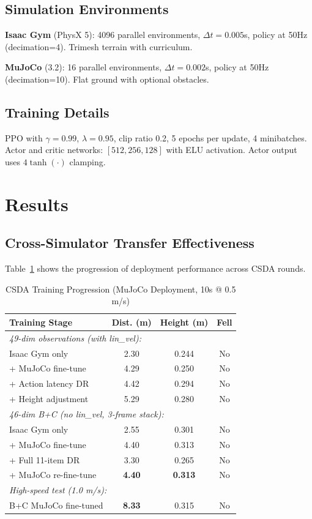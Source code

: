\documentclass[conference]{IEEEtran}
\begin{document}
\subsection{Simulation Environments}

\textbf{Isaac Gym} (PhysX 5): 4096 parallel environments, $\Delta t = 0.005$s, policy at 50Hz (decimation=4). Trimesh terrain with curriculum.

\textbf{MuJoCo} (3.2): 16 parallel environments, $\Delta t = 0.002$s, policy at 50Hz (decimation=10). Flat ground with optional obstacles.

\subsection{Training Details}

PPO with $\gamma = 0.99$, $\lambda = 0.95$, clip ratio 0.2, 5 epochs per update, 4 minibatches. Actor and critic networks: $[512, 256, 128]$ with ELU activation. Actor output uses $4 \tanh(\cdot)$ clamping.

\section{Results}

\subsection{Cross-Simulator Transfer Effectiveness}

Table~\ref{tab:main_results} shows the progression of deployment performance across CSDA rounds.

\begin{table}[t]
\caption{CSDA Training Progression (MuJoCo Deployment, 10s @ 0.5 m/s)}
\label{tab:main_results}
\centering
\begin{tabular}{lccc}
\toprule
\textbf{Training Stage} & \textbf{Dist. (m)} & \textbf{Height (m)} & \textbf{Fell} \\
\midrule
\multicolumn{4}{l}{\textit{49-dim observations (with lin\_vel):}} \\
Isaac Gym only & 2.30 & 0.244 & No \\
+ MuJoCo fine-tune & 4.29 & 0.250 & No \\
+ Action latency DR & 4.42 & 0.294 & No \\
+ Height adjustment & 5.29 & 0.280 & No \\
\midrule
\multicolumn{4}{l}{\textit{46-dim B+C (no lin\_vel, 3-frame stack):}} \\
Isaac Gym only & 2.55 & 0.301 & No \\
+ MuJoCo fine-tune & 4.40 & 0.313 & No \\
+ Full 11-item DR & 3.30 & 0.265 & No \\
+ MuJoCo re-fine-tune & \textbf{4.40} & \textbf{0.313} & No \\
\midrule
\multicolumn{4}{l}{\textit{High-speed test (1.0 m/s):}} \\
B+C MuJoCo fine-tuned & \textbf{8.33} & 0.315 & No \\
\bottomrule
\end{tabular}
\end{table}
\end{document}
